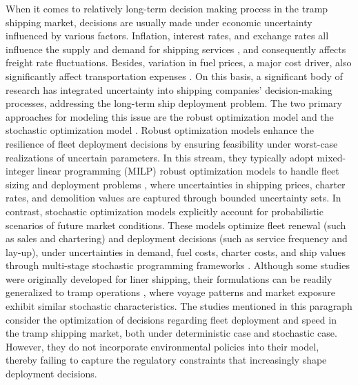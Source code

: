 \documentclass[11pt,english]{article}
\begin{document}
When it comes to relatively long-term decision making process in the tramp shipping market, decisions are usually made under economic uncertainty influenced by various factors. Inflation, interest rates, and exchange rates all influence the supply and demand for shipping services \citep{abakah2024asymmetric}, and consequently affects freight rate fluctuations. Besides, variation in fuel prices, a major cost driver, also significantly affect transportation expenses \citep{jia2024resilience,vcech2022marine,xu2011dynamics}. On this basis, a significant body of research has integrated uncertainty into shipping companies' decision-making processes, addressing the long-term ship deployment problem. The two primary approaches for modeling this issue are the robust optimization model and the stochastic optimization model \citep{christiansen2025fifty}. Robust optimization models enhance the resilience of fleet deployment decisions by ensuring feasibility under worst-case realizations of uncertain parameters. In this stream, they typically adopt mixed-integer linear programming (MILP) robust optimization models to handle fleet sizing \citep{wu2021robust} and deployment problems \citep{alvarez2011robust}, where uncertainties in shipping prices, charter rates, and demolition values are captured through bounded uncertainty sets. In contrast, stochastic optimization models explicitly account for probabilistic scenarios of future market conditions. These models optimize fleet renewal (such as sales and chartering) and deployment decisions (such as service frequency and lay-up), under uncertainties in demand, fuel costs, charter costs, and ship values through multi-stage stochastic programming frameworks \citep{pantuso2016uncertainty, arslan2017bulk}. Although some studies were originally developed for liner shipping, their formulations can be readily generalized to tramp operations \citep{pantuso2016uncertainty}, where voyage patterns and market exposure exhibit similar stochastic characteristics. The studies mentioned in this paragraph consider the optimization of decisions regarding fleet deployment and speed in the tramp shipping market, both under deterministic case and stochastic case. However, they do not incorporate environmental policies into their model, thereby failing to capture the regulatory constraints that increasingly shape deployment decisions.
\end{document}
